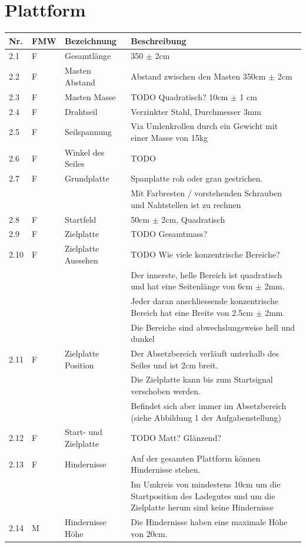 \documentclass[a4paper]{report}
\begin{document}
\section{Plattform}
\begin{tabular}{|p{}|p{}|p{}|p{}|}
	\hline
	\textbf{Nr.} & \textbf{FMW\footnotemark} & \textbf{Bezeichnung} & \textbf{Beschreibung} \\
	\hline
	2.1 & F & Gesamtlänge & 350 $\pm$ 2cm \\
	\hline
	2.2 & F & Masten Abstand & Abstand zwischen den Masten 350cm $\pm$ 2cm \\
	\hline
	2.3 & F & Masten Masse & TODO Quadratisch? 10cm $\pm$ 1 cm \\
	\hline
	2.4 & F & Drahtseil & Verzinkter Stahl, Durchmesser 3mm \\
	\hline
	2.5 & F & Seilspannung & Via Umlenkrollen durch ein Gewicht mit einer Masse von 15kg \\
	\hline
	2.6 & F & Winkel des Seiles & TODO \\
	\hline
	2.7 & F & Grundplatte & Spanplatte roh oder grau gestrichen.\\
	& & & Mit Farbresten / vorstehenden Schrauben und Nahtstellen ist zu rechnen \\
	\hline
	2.8 & F & Startfeld & 50cm $\pm$ 2cm, Quadratisch \\
	\hline
	2.9 & F & Zielplatte & TODO Gesamtmass? \\
	\hline
	2.10 & F & Zielplatte Aussehen & TODO Wie viele konzentrische Bereiche?\\
	& & & Der innerste, helle Bereich ist quadratisch und hat eine Seitenlänge von 6cm $\pm$ 2mm. \\
	& & & Jeder daran anschliessende konzentrische Bereich hat eine Breite von 2.5cm $\pm$ 2mm. \\
	& & & Die Bereiche sind abwechslungsweise hell und dunkel \\
	\hline
	2.11 & F & Zielplatte Position & Der Absetzbereich verläuft unterhalb des Seiles und ist 2cm breit.\\
	& & & Die Zielplatte kann bis zum Startsignal verschoben werden.\\
	& & & Befindet sich aber immer im Absetzbereich (siehe Abbildung 1 der Aufgabenstellung) \\
	\hline
	2.12 & F & Start- und Zielplatte & TODO Matt? Glänzend? \\
	\hline
	2.13 & F & Hindernisse & Auf der gesamten Plattform können Hindernisse stehen.\\
	& & & Im Umkreis von mindestens 10cm um die Startposition des Ladegutes und um die Zielplatte herum sind keine Hindernisse \\
	\hline
	2.14 & M & Hindernisse Höhe & Die Hindernisse haben eine maximale Höhe von 20cm. \\
	\hline
\end{tabular}
\end{document}
